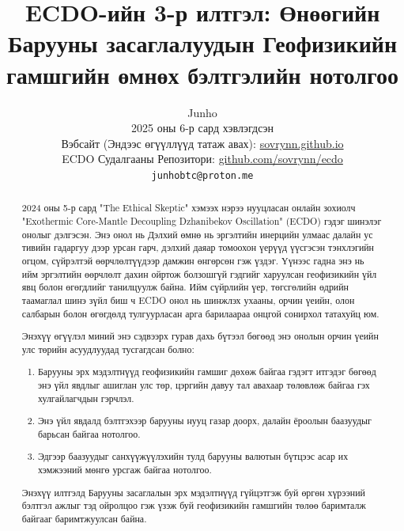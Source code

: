 \documentclass[10pt,twocolumn,letterpaper]{article}
\begin{document}
\title{ECDO-ийн 3-р илтгэл: Өнөөгийн Барууны засаглалуудын Геофизикийн гамшгийн өмнөх бэлтгэлийн нотолгоо}

\author{Junho\\
2025 оны 6-р сард хэвлэгдсэн\\
Вэбсайт (Эндээс өгүүллүүд татаж авах): \href{https://sovrynn.github.io}{sovrynn.github.io}\\
ECDO Судалгааны Репозитори: \href{https://github.com/sovrynn/ecdo}{github.com/sovrynn/ecdo}\\
{\tt\small junhobtc@proton.me}
}
\maketitle

\begin{abstract}
2024 оны 5-р сард "The Ethical Skeptic" \cite{0} хэмээх нэрээ нууцласан онлайн зохиолч "Exothermic Core-Mantle Decoupling Dzhanibekov Oscillation" (ECDO) \cite{1} гэдэг шинэлэг онолыг дэлгэсэн. Энэ онол нь Дэлхий өмнө нь эргэлтийн инерцийн улмаас далайн ус тивийн гадаргуу дээр урсан гарч, дэлхий даяар томоохон үерүүд үүсгэсэн тэнхлэгийн огцом, сүйрэлтэй өөрчлөлтүүдээр дамжин өнгөрсөн гэж үздэг. Үүнээс гадна энэ нь ийм эргэлтийн өөрчлөлт дахин ойртож болзошгүй гэдгийг харуулсан геофизикийн үйл явц болон өгөгдлийг танилцуулж байна. Ийм сүйрлийн үер, төгсгөлийн өдрийн таамаглал шинэ зүйл биш ч ECDO онол нь шинжлэх ухааны, орчин үеийн, олон салбарын болон өгөгдөлд тулгуурласан арга барилаараа онцгой сонирхол татахуйц юм.

Энэхүү өгүүлэл миний энэ сэдвээрх гурав дахь бүтээл \cite{2,3} бөгөөд энэ онолын орчин үеийн улс төрийн асуудлуудад тусгагдсан болно:
\begin{flushleft}
\begin{enumerate}
\item Барууны эрх мэдэлтнүүд геофизикийн гамшиг дөхөж байгаа гэдэгт итгэдэг бөгөөд энэ үйл явдлыг ашиглан улс төр, цэргийн давуу тал авахаар төлөвлөж байгаа гэх хулгайлагчдын гэрчлэл.
\item Энэ үйл явдалд бэлтгэхээр барууны нууц газар доорх, далайн ёроолын баазуудыг барьсан байгаа нотолгоо.
\item Эдгээр баазуудыг санхүүжүүлэхийн тулд барууны валютын бүтцээс асар их хэмжээний мөнгө урсгаж байгаа нотолгоо.
\end{enumerate}
\end{flushleft}
Энэхүү илтгэлд Барууны засаглалын эрх мэдэлтнүүд гүйцэтгэж буй өргөн хүрээний бэлтгэл ажлыг тэд ойролцоо гэж үзэж буй геофизикийн гамшгийн төлөө баримталж байгааг баримтжуулсан байна.
\end{abstract}
\end{document}
